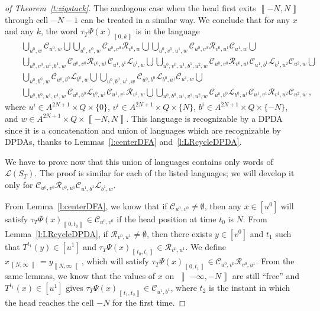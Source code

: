\documentclass{llncs}
\newcommand{\lang}{\mathcal L}
\newcommand{\co}[2]{\left\llbracket #1,#2\right\llbracket}\newcommand{\cc}[2]{\left\llbracket #1,#2\right\rrbracket}\newcommand{\oo}[2]{\left\rrbracket #1,#2\right\llbracket}\newcommand{\oc}[2]{\left\rrbracket #1,#2\right\rrbracket}\newcommand{\ci}[1]{\co{#1}\infty}\newcommand{\io}[1]{\oo{-\infty}{#1}}\newcommand{\oi}[1]{\oo{#1}\infty}\newcommand{\ic}[1]{\oc{-\infty}{#1}}
\newcommand{\scc}[2]{_{\cc{#1}{#2}}}\newcommand{\sco}[2]{_{\co{#1}{#2}}}\newcommand{\soo}[2]{_{\oo{#1}{#2}}}\newcommand{\soc}[2]{_{\oc{#1}{#2}}}\newcommand{\sci}[1]{_{\ci{#1}}}\newcommand{\sio}[1]{_{\io{#1}}}\newcommand{\soi}[1]{_{\oi{#1}}}\newcommand{\sic}[1]{_{\ic{#1}}}
\begin{document}
\begin{proof}[of Theorem~\ref{t:zigstack}]
The analogous case when the head first exits $\cc{-N}N$ through cell $-N-1$ can be treated in a similar way. We conclude that for any $x$ and any $k$, the word $\tau_T\Psi(x)\scc0k$ is in the language
\begin{eqnarray*}&&
\bigcup_{u^0,w}\mathcal C_{u^0,w} \bigcup
\bigcup_{u^0,v^0,w}\mathcal C_{u^0,v^0}\mathcal R_{v^0,w} \bigcup
\bigcup_{u^0,v^0,u^1,w}\mathcal C_{u^0,v^0}\mathcal R_{v^0,u^1}\mathcal C_{u^1,w} \bigcup\\&&
\bigcup_{u^0,v^0,u^1,b^1,w}\mathcal C_{u^0,v^0}\mathcal R_{v^0,u^1}\mathcal C_{u^1,b^1}\mathcal L_{b^1,w} \bigcup
\bigcup_{u^0,v^0,u^1,b^1,u^2,w}\mathcal C_{u^0,v^0}\mathcal R_{v^0,u^1}\mathcal C_{u^1,b^1}\mathcal L_{b^1,u^2}\mathcal C_{u^2,w} \bigcup\\&&
\bigcup_{u^0,b^0,w}\mathcal C_{u^0,b^0}\mathcal L_{b^0,w} \bigcup \bigcup_{u^0,b^0,u^1,w}\mathcal C_{u^0,b^0}\mathcal L_{b^0,u^1}\mathcal C_{u^1,w} \bigcup\\&&
\bigcup_{u^0,b^0,u^1,v^1,w}\mathcal C_{u^0,b^0}\mathcal L_{b^0,u^1}\mathcal C_{u^1,v^1}\mathcal R_{v^1,w} \bigcup
\bigcup_{u^0,b^0,u^1,v^1,u^2,w}\mathcal C_{u^0,b^0}\mathcal L_{b^0,u^1}\mathcal C_{u^1,v^1}\mathcal R_{v^1,u^2}\mathcal C_{u^2,w}~,
\end{eqnarray*}
where $u^i\in A^{2N+1}\times Q\times \{0\}$, $v^i\in A^{2N+1}\times Q\times \{N\}$, $b^i\in A^{2N+1}\times Q\times \{-N\}$, and $w\in A^{2N+1}\times Q\times \cc{-N}N$.
This language is recognizable by a DPDA since it is a concatenation and union of languages which are recognizable by DPDAs, thanks to Lemmas~\ref{l:centerDFA} and~\ref{l:LRcycleDPDA}.

We have to prove now that this union of languages contains only words of $\lang(S_T)$. The proof is similar for each of the listed languages; we will develop it only for
$\mathcal C_{u^0,v^0}\mathcal R_{v^0,u^1}\mathcal C_{u^1,b^1}\mathcal L_{b^1,w}$.

From Lemma~\ref{l:centerDFA}, we know that if $\mathcal C_{u^0,v^0}\ne\emptyset$, then any $x\in [u^0]$ will satisfy $\tau_T\Psi(x)\scc0{t_0}\in \mathcal C_{u^0,v^0}$ if the head position at time $t_0$ is $N$.
From Lemma~\ref{l:LRcycleDPDA}, if $\mathcal R_{v^0,u^1}\ne\emptyset$, then there exists $y\in [v^0]$ and $t_1$ such that $T^{t_1}(y)\in [u^1]$ and $\tau_T\Psi(x)\scc{t_0}{t_1}\in \mathcal R_{v^0,u^1}$.
We define $x\sci{N}=y\sci N$, which will satisfy $\tau_T\Psi(x)\scc0{t_1}\in \mathcal C_{u^0,v^0}\mathcal R_{v^0,u^1}$.
From the same lemmas, we know that the values of $x$ on $\ic{-N}$ are still ``free'' and $T^{t_1}(x)\in [u^1]$ gives $\tau_T\Psi(x)\scc{t_1}{t_2}\in \mathcal C_{u^1,b^1}$, where $t_2$ is the instant in which the head reaches the cell $-N$ for the first time.


\end{proof}
\end{document}
